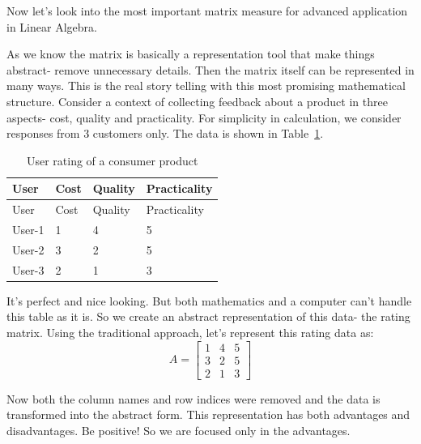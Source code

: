 \documentclass[
  letterpaper,
  DIV=11,
  numbers=noendperiod]{scrreprt}
\theoremstyle{plain}
\theoremstyle{definition}
\theoremstyle{remark}
\begin{document}
Now let's look into the most important matrix measure for advanced
application in Linear Algebra.

As we know the matrix is basically a representation tool that make
things abstract- remove unnecessary details. Then the matrix itself can
be represented in many ways. This is the real story telling with this
most promising mathematical structure. Consider a context of collecting
feedback about a product in three aspects- cost, quality and
practicality. For simplicity in calculation, we consider responses from
3 customers only. The data is shown in Table~\ref{tbl-RT}.

\begin{longtable}[]{@{}llll@{}}
\caption{User rating of a consumer product}\label{tbl-RT}\tabularnewline
\toprule\noalign{}
User & Cost & Quality & Practicality \\
\midrule\noalign{}
\endfirsthead
\toprule\noalign{}
User & Cost & Quality & Practicality \\
\midrule\noalign{}
\endhead
\bottomrule\noalign{}
\endlastfoot
User-1 & 1 & 4 & 5 \\
User-2 & 3 & 2 & 5 \\
User-3 & 2 & 1 & 3 \\
\end{longtable}

It's perfect and nice looking. But both mathematics and a computer can't
handle this table as it is. So we create an abstract representation of
this data- the rating matrix. Using the traditional approach, let's
represent this rating data as:
\[A=\begin{bmatrix}1&4&5\\3&2&5\\2&1&3\end{bmatrix}\]

Now both the column names and row indices were removed and the data is
transformed into the abstract form. This representation has both
advantages and disadvantages. Be positive! So we are focused only in the
advantages.
\end{document}
